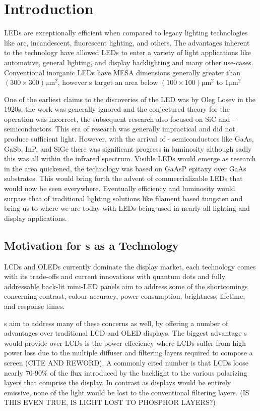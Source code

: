 \section{Introduction}

LEDs are exceptionally efficient when compared to legacy lighting technologies like arc, incandescent, fluorescent lighting, and others. The advantages inherent to the technology have allowed LEDs to enter a variety of light applications like automotive, general lighting, and display backlighting and many other use-cases. \cite{uLED_review}
Conventional inorganic LEDs have MESA dimensions generally greater than $(300\times 300) \unit{\micro\meter\squared}$, however \uled s target an area below $(100\times 100) \unit{\micro\meter\squared}$ to $1 \unit{\micro\meter\squared}$ \cite{parbrook2021micro}

One of the earliest claims to the discoveries of the LED was by Oleg Losev in the 1920s, the work was generally ignored and the conjectured theory for the operation was incorrect, the subsequent research also focused on SiC and - semiconductors. This era of research was generally impractical and did not produce sufficient light. However, with the arrival of - semiconductors like GaAs, GaSb, InP, and SiGe there was significant progress in luminosity although sadly this was all within the infrared spectrum. 
Visible LEDs would emerge as research in the area quickened, the technology was based on GaAsP epitaxy over GaAs substrates. This would bring forth the advent of commercializable LEDs that would now be seen everywhere. Eventually efficiency and luminosity would surpass that of traditional lighting solutions like filament based tungsten and bring us to where we are today with LEDs being used in nearly all lighting and display applications.




\subsection{Motivation for \uled s as a Technology}
LCDs and OLEDs currently dominate the display market, each technology comes with its trade-offs and current innovations with quantum dots and fully addressable back-lit mini-LED panels aim to address some of the shortcomings concerning contrast, colour accuracy, power consumption, brightness, lifetime, and response times.

\uled s aim to address many of these concerns as well, by offering a number of advantages over traditional LCD and OLED displays. The biggest advantage \uled s would provide over LCDs is the power effeciency where LCDs suffer from high power loss due to the multiple diffuser and filtering layers required to compose a screen (CITE AND REWORD). A commonly cited number is that LCDs loose nearly 70-90\% of the flux introduced by the backlight to the various polarizing layers that comprise the display. In contrast as \uled  displays would be entirely emissive, none of the light would be lost to the conventional filtering layers. (IS THIS EVEN TRUE, IS LIGHT LOST TO PHOSPHOR LAYERS?)


